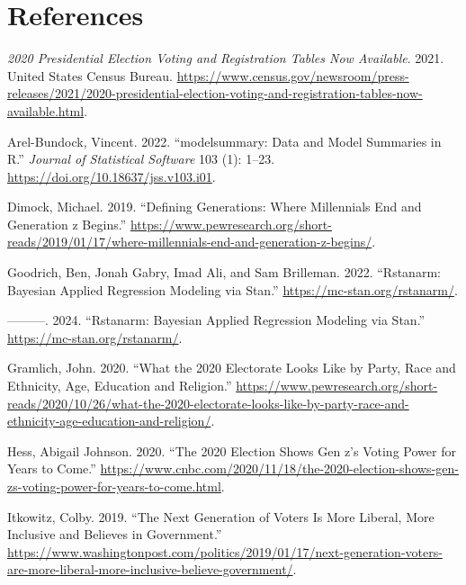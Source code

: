 \documentclass[
  letterpaper,
  DIV=11,
  numbers=noendperiod]{scrartcl}
\newlength{\cslhangindent}
\newlength{\cslentryspacingunit} %
\newenvironment{CSLReferences}[2] %
 {%
  \setlength{\parindent}{0pt}
  \ifodd #1
  \let\oldpar\par
  \def\par{\hangindent=\cslhangindent\oldpar}
  \fi
  \setlength{\parskip}{#2\cslentryspacingunit}
 }%
 {}
\begin{document}
\newpage

\hypertarget{references}{%
\section*{References}\label{references}}

\hypertarget{refs}{}
\begin{CSLReferences}{1}{0}
\leavevmode{}%
\emph{2020 Presidential Election Voting and Registration Tables Now
Available}. 2021. United States Census Bureau.
\url{https://www.census.gov/newsroom/press-releases/2021/2020-presidential-election-voting-and-registration-tables-now-available.html}.

\leavevmode{}%
Arel-Bundock, Vincent. 2022. {``{modelsummary}: Data and Model Summaries
in {R}.''} \emph{Journal of Statistical Software} 103 (1): 1--23.
\url{https://doi.org/10.18637/jss.v103.i01}.

\leavevmode{}%
Dimock, Michael. 2019. {``Defining Generations: Where Millennials End
and Generation z Begins.''}
\url{https://www.pewresearch.org/short-reads/2019/01/17/where-millennials-end-and-generation-z-begins/}.

\leavevmode{}%
Goodrich, Ben, Jonah Gabry, Imad Ali, and Sam Brilleman. 2022.
{``Rstanarm: {Bayesian} Applied Regression Modeling via {Stan}.''}
\url{https://mc-stan.org/rstanarm/}.

\leavevmode{}%
---------. 2024. {``Rstanarm: {Bayesian} Applied Regression Modeling via
{Stan}.''} \url{https://mc-stan.org/rstanarm/}.

\leavevmode{}%
Gramlich, John. 2020. {``What the 2020 Electorate Looks Like by Party,
Race and Ethnicity, Age, Education and Religion.''}
\url{https://www.pewresearch.org/short-reads/2020/10/26/what-the-2020-electorate-looks-like-by-party-race-and-ethnicity-age-education-and-religion/}.

\leavevmode{}%
Hess, Abigail Johnson. 2020. {``The 2020 Election Shows Gen z's Voting
Power for Years to Come.''}
\url{https://www.cnbc.com/2020/11/18/the-2020-election-shows-gen-zs-voting-power-for-years-to-come.html}.

\leavevmode{}%
Itkowitz, Colby. 2019. {``The Next Generation of Voters Is More Liberal,
More Inclusive and Believes in Government.''}
\url{https://www.washingtonpost.com/politics/2019/01/17/next-generation-voters-are-more-liberal-more-inclusive-believe-government/}.


\end{CSLReferences}
\end{document}
